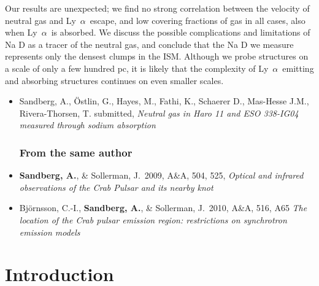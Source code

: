 \documentclass[a4wide,12pt]{book}
\def\aap{A\&A}%
\newcommand{\lya}{Ly~${\alpha}$}
\begin{document}
{Our results are unexpected; we find no strong correlation between the velocity of neutral gas and \lya\ escape, and low covering fractions of gas in all cases, also when \lya\ is absorbed. We discuss the possible complications and limitations of Na D as a tracer of the neutral gas, and conclude that the Na D we measure represents only the densest clumps in the ISM. Although we probe structures on a scale of only a few hundred pc, it is likely that the complexity of \lya\ emitting and absorbing structures continues on even smaller scales.

\clearpage

\begin{itemize}

\thispagestyle{empty}

\section*{List of papers}

\item
Sandberg, A., {\"O}stlin, G., Hayes, M., Fathi, K., Schaerer D., Mas-Hesse J.M., Rivera-Thorsen, T. submitted, {\it Neutral gas in Haro 11 and ESO 338-IG04 measured through sodium absorption}



\subsection*{From the same author}

\item
{\bf Sandberg, A.}, \& Sollerman, J.\ 2009, \aap, 504, 525, {\it Optical and infrared observations of the Crab Pulsar and its nearby knot}

\item
Bj{\"o}rnsson, C.-I., {\bf Sandberg, A.}, \& Sollerman, J.\ 2010, \aap, 516, A65 {\it The location of the Crab pulsar emission region: restrictions on synchrotron emission models}



\end{itemize}

\tableofcontents

\thispagestyle{empty}

\chapter{Introduction}


}
\end{document}
